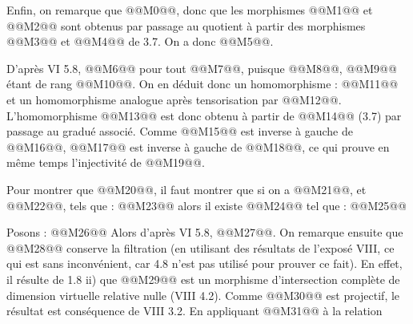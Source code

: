 
Enfin, on remarque que @@M0@@, donc que les morphismes @@M1@@ et @@M2@@ sont obtenus par passage au quotient à partir des morphismes @@M3@@ et @@M4@@ de 3.7. On a donc @@M5@@.

D'après VI 5.8, @@M6@@ pour tout @@M7@@, puisque @@M8@@, @@M9@@ étant de rang @@M10@@. On en déduit donc un homomorphisme :
@@M11@@
et un homomorphisme analogue après tensorisation par @@M12@@. L'homomorphisme @@M13@@ est donc obtenu à partir de @@M14@@ (3.7) par passage au gradué associé. Comme @@M15@@ est inverse à gauche de @@M16@@, @@M17@@ est inverse à gauche de @@M18@@, ce qui prouve en même temps l'injectivité de @@M19@@.

Pour montrer que @@M20@@, il faut montrer que si on a @@M21@@, et @@M22@@, tels que :
@@M23@@
alors il existe @@M24@@ tel que :
@@M25@@

Posons :
@@M26@@
Alors d'après VI 5.8, @@M27@@. On remarque ensuite que @@M28@@ conserve la filtration (en utilisant des résultats de l'exposé VIII, ce qui est sans inconvénient, car 4.8 n'est pas utilisé pour prouver ce fait). En effet, il résulte de 1.8 ii) que @@M29@@ est un morphisme d'intersection complète de dimension virtuelle relative nulle (VIII 4.2). Comme @@M30@@ est projectif, le résultat est conséquence de VIII 3.2. En appliquant @@M31@@ à la relation
